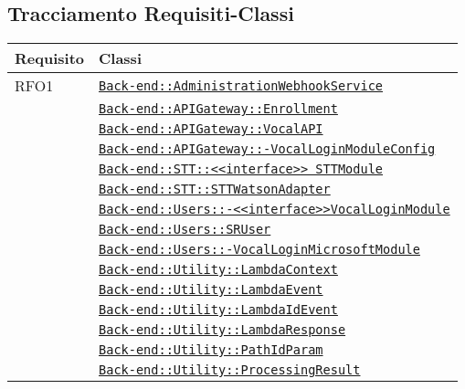 \subsection{Tracciamento Requisiti-Classi}
\normalsize
\begin{longtable}{|>{\centering}m{3cm}|m{10cm}<{\centering}|}
\hline
\textbf{Requisito} & \textbf{Classi}\\
\hline
\endhead
RFO1 & \hyperref[Back-end::AdministrationWebhookService]{\texttt{Back-end::AdministrationWebhookService}}\\
& \hyperref[Back-end::APIGateway::Enrollment]{\texttt{Back-end::APIGateway::Enrollment}}\\
& \hyperref[Back-end::APIGateway::VocalAPI]{\texttt{Back-end::APIGateway::VocalAPI}}\\
& \hyperref[Back-end::APIGateway::VocalLoginModuleConfig]{\texttt{Back-end::APIGateway::-\linebreak VocalLoginModuleConfig}}\\
& \hyperref[Back-end::STT::<<interface>> STTModule]{\texttt{Back-end::STT::<<interface>> STTModule}}\\
& \hyperref[Back-end::STT::STTWatsonAdapter]{\texttt{Back-end::STT::STTWatsonAdapter}}\\
& \hyperref[Back-end::Users::<<interface>>VocalLoginModule]{\texttt{Back-end::Users::-\linebreak <<interface>>VocalLoginModule}}\\
& \hyperref[Back-end::Users::SRUser]{\texttt{Back-end::Users::SRUser}}\\
& \hyperref[Back-end::Users::VocalLoginMicrosoftModule]{\texttt{Back-end::Users::-\linebreak VocalLoginMicrosoftModule}}\\
& \hyperref[Back-end::Utility::LambdaContext]{\texttt{Back-end::Utility::LambdaContext}}\\
& \hyperref[Back-end::Utility::LambdaEvent]{\texttt{Back-end::Utility::LambdaEvent}}\\
& \hyperref[Back-end::Utility::LambdaIdEvent]{\texttt{Back-end::Utility::LambdaIdEvent}}\\
& \hyperref[Back-end::Utility::LambdaResponse]{\texttt{Back-end::Utility::LambdaResponse}}\\
& \hyperref[Back-end::Utility::PathIdParam]{\texttt{Back-end::Utility::PathIdParam}}\\
& \hyperref[Back-end::Utility::ProcessingResult]{\texttt{Back-end::Utility::ProcessingResult}}\\

\end{longtable}
